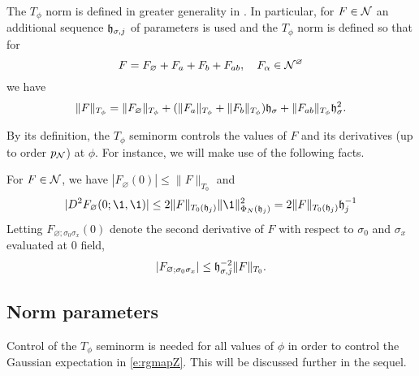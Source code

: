 The $T_\phi$ norm is defined in greater generality in \cite{BS-rg-norm}.
In particular, for $F \in \mathcal{N}$ an additional sequence $\mathfrak{h}_{\sigma,j}$
of parameters is used and the $T_\phi$ norm is defined so that for
\begin{equation}
F = F_\varnothing + F_a + F_b + F_{ab},
	\quad
F_\alpha \in \mathcal{N}^\varnothing
\end{equation}
we have
\begin{equation}
\|F\|_{T_\phi}
	=
\|F_\varnothing\|_{T_\phi}
	+ (\|F_a\|_{T_\phi} + \|F_b\|_{T_\phi}) \mathfrak{h}_\sigma
	+ \|F_{ab}\|_{T_\phi} \mathfrak{h}_\sigma^2.
\end{equation}

By its definition, the $T_\phi$ seminorm controls the values of $F$ and its derivatives
(up to order $p_{\mathcal{N}}$) at $\phi$. For instance, we will make use of the following facts.

\begin{lemma}
\label{lem:deriv-norm-bds}
For $F \in \mathcal{N}$, we have $|F_\varnothing(0)| \le \|F\|_{T_0}$ and
\begin{equation}
\label{e:deriv-norm-bd}
|D^2 F_\varnothing(0; \1, \1)|
	\le
2 \|F\|_{T_0(\h_j)} \|\1\|^2_{\Phi_N(\h_j)}
	=
2 \|F\|_{T_0(\h_j)} \h_j^{-1}
\end{equation}
Letting $F_{\varnothing;\sigma_0\sigma_x}(0)$ denote the second derivative of $F$ with
respect to $\sigma_0$ and $\sigma_x$ evaluated at $0$ field,
\begin{equation}
|F_{\varnothing;\sigma_0\sigma_x}|
	\le
\mathfrak{h}_{\sigma,j}^{-2} \|F\|_{T_0}.
\end{equation}
\end{lemma}

\subsection{Norm parameters}

Control of the $T_\phi$ seminorm is needed for all values of
$\phi$ in order to control the Gaussian expectation in \eqref{e:rgmapZ}. This will
be discussed further in the sequel.

